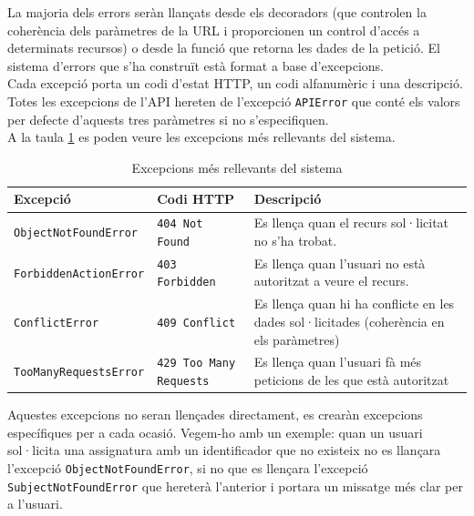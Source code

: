 La majoria dels errors seràn llançats desde els decoradors (que controlen la coherència dels paràmetres de la \ac{URL} i proporcionen un control d'accés a determinats recursos) o desde la funció que retorna les dades de la petició. El sistema d'errors que s'ha construït està format a base d'excepcions.\\

Cada excepció porta un codi d'estat \ac{HTTP}, un codi alfanumèric i una descripció. Totes les excepcions de l'\ac{API} hereten de l'excepció \texttt{APIError} que conté els valors per defecte d'aquests tres paràmetres si no s'especifiquen.\\

A la taula \ref{table:excepcions} es poden veure les excepcions més rellevants del sistema.

\begin{table}[h!]
	\begin{center}
 		\begin{tabularx}{\textwidth}{|l|l|X|}
  			\hline
 			\bfseries Excepció & \bfseries Codi \ac{HTTP} & \bfseries Descripció\\ \hline
			\texttt{ObjectNotFoundError} & \texttt{404 Not Found} &  Es llença quan el recurs sol·licitat no s'ha trobat.\\ \hline
			\texttt{ForbiddenActionError} & \texttt{403 Forbidden} & Es llença quan l'usuari no està autoritzat a veure el recurs. \\ \hline
			\texttt{ConflictError} & \texttt{409 Conflict} & Es llença quan hi ha conflicte en les dades sol·licitades (coherència en els paràmetres) \\ \hline
			\texttt{TooManyRequestsError} & \texttt{429 Too Many Requests} & Es llença quan l'usuari fà més peticions de les que està autoritzat \\ \hline
		\end{tabularx}
	\end{center}
	\caption{Excepcions més rellevants del sistema}
	\label{table:excepcions}
\end{table}

Aquestes excepcions no seran llençades directament, es crearàn excepcions específiques per a cada ocasió. Vegem-ho amb un exemple: quan un usuari sol·licita una assignatura amb un identificador que no existeix no es llançara l'excepció \texttt{ObjectNotFoundError}, si no que es llençara l'excepció \texttt{SubjectNotFoundError} que hereterà l'anterior i portara un missatge més clar per a l'usuari.\\

